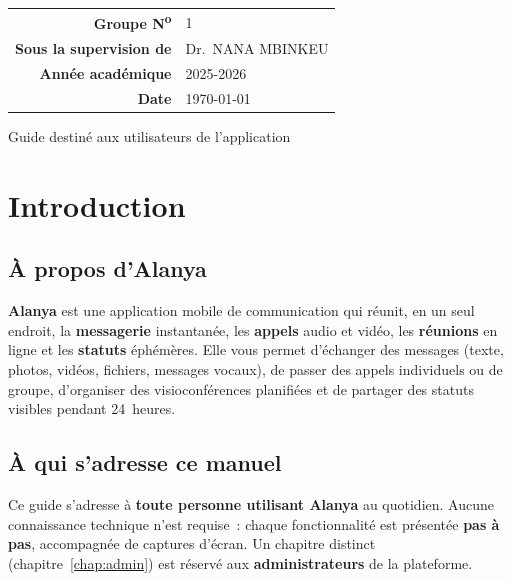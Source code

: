 \documentclass[11pt,a4paper,oneside]{report}
\newcommand{\thd}[1]{\textbf{\textcolor{AlanyaIndigoDark}{#1}}}
\begin{document}
\begin{titlepage}
\vfill

\begin{center}\sffamily
  \begin{tabular}{@{}r@{\quad}l@{}}
    \thd{Groupe N\textsuperscript{o}}        & 1\\[3pt]
    \thd{Sous la supervision de}             & Dr.\ NANA MBINKEU\\[3pt]
    \thd{Ann\'{e}e acad\'{e}mique}           & 2025-2026\\[3pt]
    \thd{Date}                               & \today\\
  \end{tabular}
\end{center}

\vspace{0.6cm}
\begin{center}\color{white}\small\sffamily
  Guide destin\'{e} aux utilisateurs de l'application
\end{center}
\end{titlepage}

\renewcommand{\contentsname}{Table des mati\`{e}res}
\tableofcontents
\listoffigures

\chapter{Introduction}
\label{chap:intro}

\section{\`{A} propos d'Alanya}
\textbf{Alanya} est une application mobile de communication qui r\'{e}unit, en un seul
endroit, la \textbf{messagerie} instantan\'{e}e, les \textbf{appels} audio et vid\'{e}o, les
\textbf{r\'{e}unions} en ligne et les \textbf{statuts} \'{e}ph\'{e}m\`{e}res. Elle vous permet
d'\'{e}changer des messages (texte, photos, vid\'{e}os, fichiers, messages vocaux),
de passer des appels individuels ou de groupe, d'organiser des visioconf\'{e}rences
planifi\'{e}es et de partager des statuts visibles pendant 24~heures.

\section{\`{A} qui s'adresse ce manuel}
Ce guide s'adresse \`{a} \textbf{toute personne utilisant Alanya} au quotidien. Aucune
connaissance technique n'est requise~: chaque fonctionnalit\'{e} est pr\'{e}sent\'{e}e
\textbf{pas \`{a} pas}, accompagn\'{e}e de captures d'\'{e}cran. Un chapitre distinct
(chapitre~\ref{chap:admin}) est r\'{e}serv\'{e} aux \textbf{administrateurs} de la plateforme.
\end{document}
